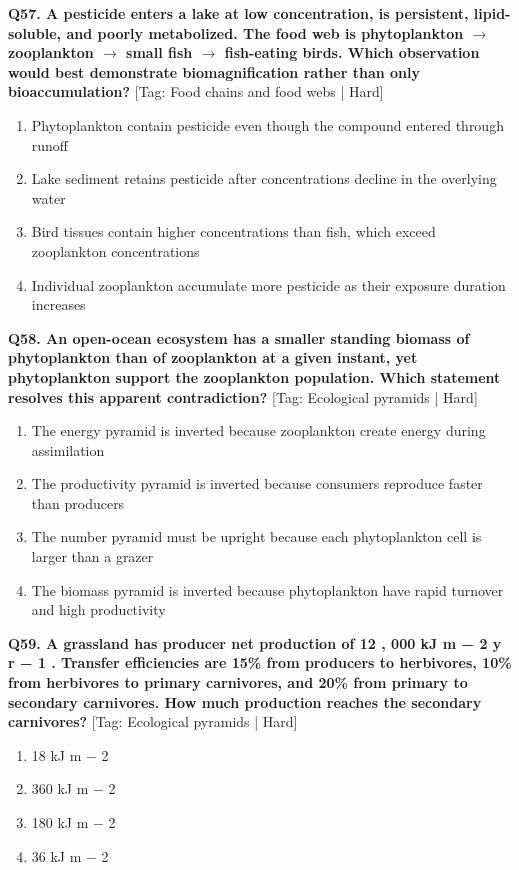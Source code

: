 \noindent\textbf{Q57. A pesticide enters a lake at low concentration, is persistent, lipid-soluble, and poorly metabolized. The food web is phytoplankton $\to$ zooplankton $\to$ small fish $\to$ fish-eating birds. Which observation would best demonstrate biomagnification rather than only bioaccumulation?} \hfill [Tag: Food chains and food webs | Hard]
\begin{enumerate}[label=(\alph*),topsep=2pt,itemsep=1pt,partopsep=0pt,parsep=0pt]
    \item {Phytoplankton contain pesticide even though the compound entered through runoff}
    \item {Lake sediment retains pesticide after concentrations decline in the overlying water}
    \item {Bird tissues contain higher concentrations than fish, which exceed zooplankton concentrations}
    \item {Individual zooplankton accumulate more pesticide as their exposure duration increases}
\end{enumerate}
\vspace{2mm}

\noindent\textbf{Q58. An open-ocean ecosystem has a smaller standing biomass of phytoplankton than of zooplankton at a given instant, yet phytoplankton support the zooplankton population. Which statement resolves this apparent contradiction?} \hfill [Tag: Ecological pyramids | Hard]
\begin{enumerate}[label=(\alph*),topsep=2pt,itemsep=1pt,partopsep=0pt,parsep=0pt]
    \item {The energy pyramid is inverted because zooplankton create energy during assimilation}
    \item {The productivity pyramid is inverted because consumers reproduce faster than producers}
    \item {The number pyramid must be upright because each phytoplankton cell is larger than a grazer}
    \item {The biomass pyramid is inverted because phytoplankton have rapid turnover and high productivity}
\end{enumerate}
\vspace{2mm}

\noindent\textbf{Q59. A grassland has producer net production of 12 , 000 kJ m − 2 y r − 1 . Transfer efficiencies are 15\% from producers to herbivores, 10\% from herbivores to primary carnivores, and 20\% from primary to secondary carnivores. How much production reaches the secondary carnivores?} \hfill [Tag: Ecological pyramids | Hard]
\begin{enumerate}[label=(\alph*),topsep=2pt,itemsep=1pt,partopsep=0pt,parsep=0pt]
    \item {18 kJ m − 2}
    \item {360 kJ m − 2}
    \item {180 kJ m − 2}
    \item {36 kJ m − 2}
\end{enumerate}
\vspace{2mm}

